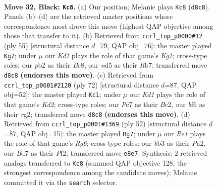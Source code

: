 \documentclass[11pt]{article}
\begin{document}
\clearpage

\begin{figure}[p]\centering
\begin{subfigure}{0.46\textwidth}\centering
\resizebox{\linewidth}{!}{%
\newchessgame
\chessboard[
  setfen={r2kr3/2pb4/pp1n1B2/P2N1p2/4p2R/1B3N2/1P2KPP1/R7 b - - 0 32},
  showmover=false,
  pgfstyle=straightmove, color=movearrow, markmove={d8-c8}
]}
\caption{}
\end{subfigure}\hfill
\begin{subfigure}{0.46\textwidth}\centering
\resizebox{\linewidth}{!}{%
\newchessgame
\chessboard[
  setfen={2b2rk1/1r3p1p/3p1Np1/2n1pP2/4P3/2P3PP/R5B1/3R2K1 b - - 2 28},
  showmover=false,
  pgfstyle=straightmove, color=movearrow, markmove={g8-g7}
]}
\caption{}
\end{subfigure}
\\[4pt]
\begin{subfigure}{0.46\textwidth}\centering
\resizebox{\linewidth}{!}{%
\newchessgame
\chessboard[
  setfen={4r1k1/1ppb4/3p4/2nP3p/1PP1P3/2N4P/2BK2r1/5R1R w - - 1 37},
  showmover=false,
  pgfstyle=straightmove, color=movearrow, markmove={d2-c1}
]}
\caption{}
\end{subfigure}\hfill
\begin{subfigure}{0.46\textwidth}\centering
\resizebox{\linewidth}{!}{%
\newchessgame
\chessboard[
  setfen={r7/pbk1b3/4p1R1/1ppnP1P1/2pPN3/8/PP3P2/2KR4 w - - 0 27},
  showmover=false,
  pgfstyle=straightmove, color=movearrow, markmove={g6-g7}
]}
\caption{}
\end{subfigure}
\caption{\textbf{Move 32, Black: \texttt{Kc8}.} (a) Our position; Melanie plays \texttt{Kc8} (\texttt{d8c8}). Panels (b)--(d) are the retrieved master positions whose correspondence most drove this move (highest QAP objective among those that transfer to it). (b) Retrieved from \texttt{ccrl\_top\_p0000\#12} (ply 55) [structural distance $d$=79, QAP obj=76]: the master played \texttt{Kg7}; under $\mu$ our \emph{Kd1} plays the role of that game's \emph{Kg1}; cross-type roles: our \emph{p}b2 as their \emph{B}c8, our \emph{n}d5 as their \emph{R}b7; transferred move \texttt{d8c8} \textbf{(endorses this move)}. (c) Retrieved from \texttt{ccrl\_top\_p0001\#2120} (ply 72) [structural distance $d$=87, QAP obj=52]: the master played \texttt{Kc1}; under $\mu$ our \emph{Kd1} plays the role of that game's \emph{Kd2}; cross-type roles: our \emph{P}c7 as their \emph{B}c2, our \emph{b}f6 as their \emph{r}g2; transferred move \texttt{d8c8} \textbf{(endorses this move)}. (d) Retrieved from \texttt{ccrl\_top\_p0001\#1369} (ply 52) [structural distance $d$=87, QAP obj=15]: the master played \texttt{Rg7}; under $\mu$ our \emph{Re1} plays the role of that game's \emph{Rg6}; cross-type roles: our \emph{b}b3 as their \emph{P}a2, our \emph{B}d7 as their \emph{P}f2; transferred move \texttt{e8e7}. Synthesis: 2 retrieved analogs transferred to \texttt{Kc8} (summed QAP objective 128, the strongest correspondence among the candidate moves); Melanie committed it via the \texttt{search} selector.}
\label{fig:thought-m63}
\end{figure}
\end{document}
